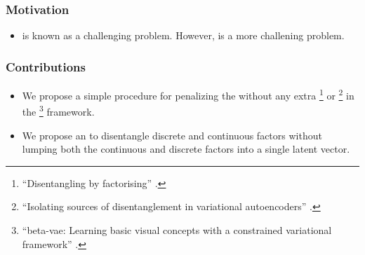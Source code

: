 \documentclass[10pt,mathserif]{beamer}
\begin{document}
\begin{frame}
\frametitle{Motivation}
\begin{itemize}\itemsep=20pt
\item {\color{blue}{Learning discrete representations}} is known as a challenging problem. However, {\color{blue}{learning continuous and discrete representations}} is a more challening problem.
\end{itemize}
\end{frame}



\begin{frame}
\frametitle{Contributions}
\begin{itemize}\itemsep=20pt
        \item We propose a simple procedure for penalizing the {\color{blue}{total correlation}} without any extra {\color{blue}{discriminator network(FactorVAE)}}\footnote{\scriptsize {\color{blue}{Kim, H. and Mnih, A.}} ``Disentangling by factorising'' {\color{gray}{ICML2018}}.} or {\color{blue}{importance sampling}} \footnote{\scriptsize{\color{blue}{Chen, T. Q., Li, X., Grosse, R. B., and Duvenaud, D. K.}} ``Isolating sources of disentanglement in variational autoencoders'' {\color{gray}{NIPS2018}}.} in the {\color{blue}{$\beta$-VAE}} \footnote{\scriptsize{\color{blue}{Higgins, I., Matthey, L., Pal, A., Burgess, C., Glorot, X., Botvinick, M., Mohamed, S., and Lerchner, A.}} ``beta-vae: Learning basic visual concepts with a constrained variational framework'' {\color{gray}{ICLR2017}}.} framework.\pause
\item We propose an {\color{blue}{alternating disentanglement method}} to disentangle discrete and continuous factors without lumping both the continuous and discrete factors into a single latent vector.
\end{itemize}
\end{frame}
\end{document}
